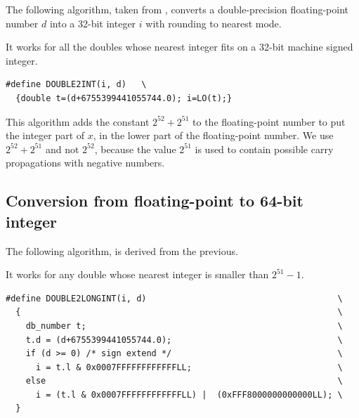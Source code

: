 \begin{theorem}
  The following algorithm, taken from \cite{AMDoptim2001}, converts a
  double-precision floating-point number $d$ into a 32-bit
  integer $i$ with rounding to nearest mode.

  It works for all the doubles whose nearest integer fits on a 32-bit machine signed integer.

\begin{lstlisting}[label={chap0:lst:conversion2},caption={Conversion from FP to int},firstnumber=1]
#define DOUBLE2INT(i, d)   \
  {double t=(d+6755399441055744.0); i=LO(t);}
\end{lstlisting}
\end{theorem}

This algorithm adds the constant $2^{52}+2^{51}$ to the floating-point
number to put the integer part of $x$, in the lower part of the
floating-point number.  We use $2^{52}+2^{51}$ and not $2^{52}$,
because the value $2^{51}$ is used to contain possible carry
propagations with negative numbers.


\subsection{Conversion from floating-point to 64-bit integer \label{sec:double2longint}}

\begin{theorem}
  The following algorithm, is derived from the previous.

  It works for any double whose nearest integer is smaller than $2^{51} -1$.

\begin{lstlisting}[label={chap0:lst:conversion3},caption={Conversion from FP to long long int},firstnumber=1]
#define DOUBLE2LONGINT(i, d)                                      \
  {                                                               \
    db_number t;                                                  \
    t.d = (d+6755399441055744.0);                                 \
    if (d >= 0) /* sign extend */                                 \
      i = t.l & 0x0007FFFFFFFFFFFFLL;                             \
    else                                                          \
      i = (t.l & 0x0007FFFFFFFFFFFFLL) |  (0xFFF8000000000000LL); \
  }
\end{lstlisting}

\end{theorem}




